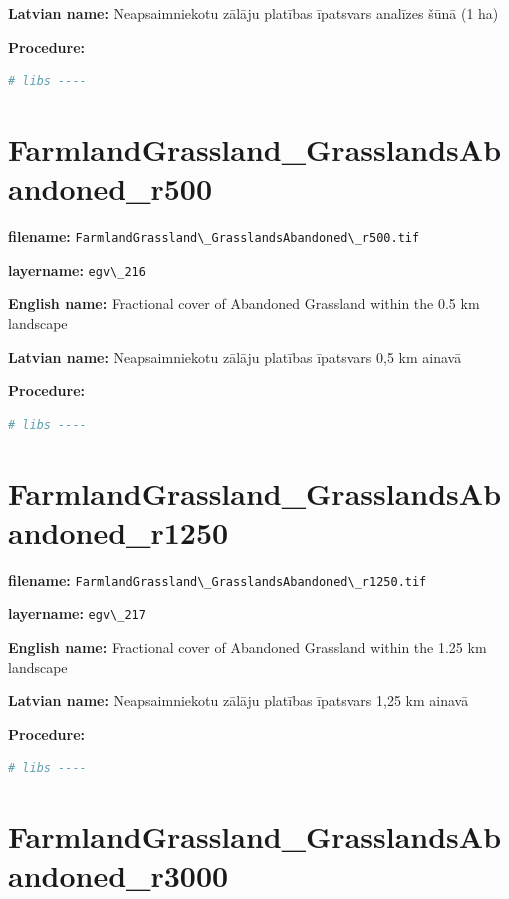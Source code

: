 \documentclass[
]{book}
\newcommand{\passthrough}[1]{#1}
\begin{document}
\textbf{Latvian name:} Neapsaimniekotu zālāju platības īpatsvars analīzes šūnā (1 ha)

\textbf{Procedure:}

\begin{lstlisting}[language=R]
# libs ----
\end{lstlisting}

\section{FarmlandGrassland\_GrasslandsAbandoned\_r500}\label{ch06.216}

\textbf{filename:} \passthrough{\lstinline!FarmlandGrassland\_GrasslandsAbandoned\_r500.tif!}

\textbf{layername:} \passthrough{\lstinline!egv\_216!}

\textbf{English name:} Fractional cover of Abandoned Grassland within the 0.5 km landscape

\textbf{Latvian name:} Neapsaimniekotu zālāju platības īpatsvars 0,5 km ainavā

\textbf{Procedure:}

\begin{lstlisting}[language=R]
# libs ----
\end{lstlisting}

\section{FarmlandGrassland\_GrasslandsAbandoned\_r1250}\label{ch06.217}

\textbf{filename:} \passthrough{\lstinline!FarmlandGrassland\_GrasslandsAbandoned\_r1250.tif!}

\textbf{layername:} \passthrough{\lstinline!egv\_217!}

\textbf{English name:} Fractional cover of Abandoned Grassland within the 1.25 km landscape

\textbf{Latvian name:} Neapsaimniekotu zālāju platības īpatsvars 1,25 km ainavā

\textbf{Procedure:}

\begin{lstlisting}[language=R]
# libs ----
\end{lstlisting}

\section{FarmlandGrassland\_GrasslandsAbandoned\_r3000}\label{ch06.218}
\end{document}
